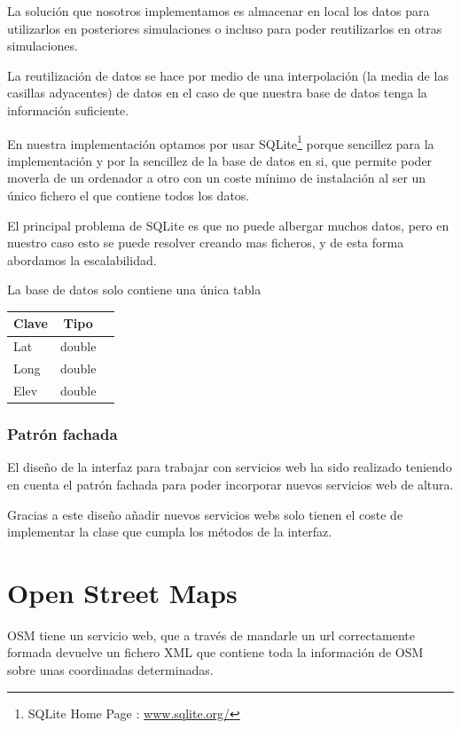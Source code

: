 La solución que nosotros implementamos es almacenar en local los datos para
utilizarlos en posteriores simulaciones o incluso para poder reutilizarlos en
otras simulaciones.

La reutilización de datos se hace por medio de una interpolación (la media de
las casillas adyacentes) de datos en el caso de que nuestra base de datos tenga
la información suficiente.

En nuestra implementación optamos por usar  SQLite\footnote{SQLite Home Page :
\url{www.sqlite.org/}} porque sencillez para la
implementación y por la sencillez de la base de datos en si, que permite poder
moverla de un ordenador a otro con un coste mínimo de instalación al ser un
único fichero el que contiene todos los datos.

El principal problema de SQLite es que no puede albergar muchos datos, pero en
nuestro caso esto se puede resolver creando mas ficheros, y de esta forma
abordamos la escalabilidad.

La base de datos solo contiene una única tabla
\begin{center}
\begin{tabular}{ | l | c | r | }
\hline
Clave & Tipo \\ \hline
Lat & double \\ \hline
Long & double \\ \hline
Elev & double \\ \hline
\end{tabular}
\end{center}


\subsubsection*{Patrón fachada}
El diseño de la interfaz para trabajar con servicios web ha sido realizado
teniendo en cuenta el patrón fachada para poder incorporar nuevos servicios web
de altura.

Gracias a este diseño añadir nuevos servicios webs solo tienen el coste de
implementar la clase que cumpla los métodos de la interfaz.
\section*{Open Street Maps}
OSM tiene un servicio web, que a través de mandarle un url correctamente
formada devuelve un fichero XML que contiene toda la información de OSM sobre
unas coordinadas determinadas.

